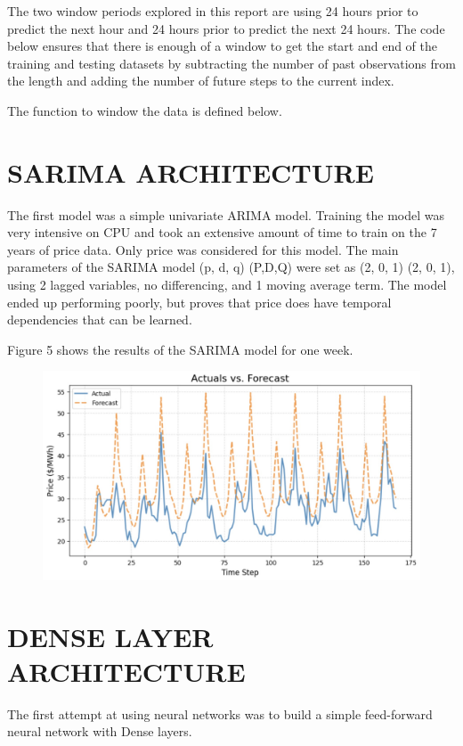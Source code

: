 \documentclass[9pt,a4paper,twoside]{rho}
\begin{document}
\noindent The two window periods explored in this report are using 24 hours prior to predict the next hour and 24 hours prior to predict the next 24 hours. The code below ensures that there is enough of a window to get the start and end of the training and testing datasets by subtracting the number of past observations from the length and adding the number of future steps to the current index.

\noindent The function to window the data is defined below.


\section*{SARIMA ARCHITECTURE}

The first model was a simple univariate ARIMA model. Training the model was very intensive on CPU and took an extensive amount of time to train on the 7 years of price data. Only price was considered for this model. The main parameters of the SARIMA model (p, d, q) (P,D,Q) were set as (2, 0, 1) (2, 0, 1), using 2 lagged variables, no differencing, and 1 moving average term. The model ended up performing poorly, but proves that price does have temporal dependencies that can be learned.

\noindent Figure 5 shows the results of the SARIMA model for one week.
\begin{figure}[H]
	\centering
	\includegraphics[width=0.8\columnwidth]{Figures/ARIMA_Results.png}
\end{figure}


\section*{DENSE LAYER ARCHITECTURE}

The first attempt at using neural networks was to build a simple feed-forward neural network with Dense layers.
\end{document}
